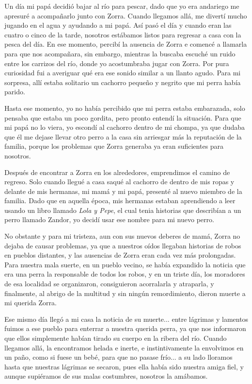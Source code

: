 Un día mi papá decidió bajar al río para pescar, dado que yo era andariego me apresuré a acompañarlo junto con Zorra. 
Cuando llegamos allá, me divertí mucho jugando en el agua y ayudando a mi papá. Así pasó el día y cuando eran las cuatro o cinco de la tarde, nosotros estábamos listos para regresar a casa con la pesca del día.
En ese momento, percibí la ausencia de Zorra e comencé a llamarla para que nos acompañara, 
sin embargo, mientras la buscaba escuché un ruido entre los carrizos del río, donde yo acostumbraba jugar con Zorra. 
Por pura curiosidad fui a averiguar qué era ese sonido similar a un llanto agudo. Para mi sorpresa, allí estaba solitario un cachorro pequeño y negrito que mi perra había parido.

Hasta ese momento, yo no había percibido que mi perra estaba embarazada, solo pensaba que estaba un poco gordita,
pero pronto entendí la situación.
Para que mi papá no lo viera, yo escondí al cachorro dentro de mi chompa, ya que dudaba que él me dejase llevar otro perro a la casa sin arriesgar más la reputación de la familia, porque los problemas que Zorra generaba ya eran suficientes para nosotros.

Después de encontrar a Zorra en los alrededores, emprendimos el camino de regreso.
Solo cuando llegué a casa saqué al cachorro de dentro de mis ropas y delante de mis hermanas, mi mamá y mi papá, presenté al nuevo miembro de la familia. Dado que en aquella época, mis hermanas estaban aprendiendo a leer usando un libro llamado \textit{Lola y Pepe}, el cual tenia historias que describían a un perro llamado Zandor, yo decidí usar ese nombre para mi nuevo perro.

No obstante y para mi tristeza, aun con sus nuevos deberes de mamá, Zorra no dejaba de causar problemas, ya que a nuestros oídos llegaban historias de robos en pueblos distantes, y las ausencias de Zorra eran cada vez más prolongadas.
Para nuestra mala suerte, en un pueblo vecino, se había expandido la noticia que era una perra la responsable de todos los robos, y en un triste día, los moradores de esa localidad se organizaron, consiguieron acorralarla y atraparla, y finalmente, al abrigo de la multitud y sin ningún remordimiento, dieron muerte a mi querida Zorra. 

Ese mismo día llegó a mi casa la noticia de su muerte... entre lágrimas y lamentos fuimos a ese pueblo para enterrar a nuestra querida perra, ya que nos informaron que ellos simplemente habían tirado su cuerpo en la ribera del río. Cuando llegamos allá, la encontramos helada e inerte, e instintivamente la envolvimos en un paño, como si fuese un bebé, para que no pasase frío... a su lado lloramos hasta que nuestras lágrimas se secaron, pues ella había sido nuestra amiga fiel, y aunque supiéramos de sus malas costumbres, nosotros la amábamos.

